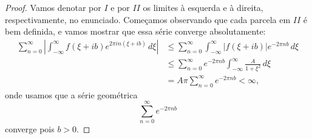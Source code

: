         \begin{proof}
            Vamos denotar por $I$ e por $II$ os limites à esquerda e à direita, respectivamente, 
            no enunciado. Começamos observando que cada parcela em $II$ é bem definida, e vamos mostrar 
            que essa série converge absolutamente:
            \begin{align*}
                \sum_{n=0}^{\infty}\left|\int_{-\infty}^{\infty} f(\xi + ib)
                e^{2 \pi i n(\xi + i b)} \, d\xi\right| 
                &\leq \sum_{n=0}^{\infty}\int_{-\infty}^{\infty} |f(\xi + ib)|
                e^{-2 \pi nb} \, d\xi \\
                &\leq \sum_{n=0}^{\infty}e^{-2 \pi nb}\int_{-\infty}^{\infty} \frac{A}{1 + \xi^2}\, d\xi \\
                &= A\pi\sum_{n=0}^{\infty}e^{-2 \pi nb}
                < \infty,
            \end{align*}
        onde usamos que a série geométrica
        \begin{equation*}
            \sum_{n=0}^{\infty}e^{-2 \pi nb}
        \end{equation*}
        converge pois $b > 0$.
        

\end{proof}
